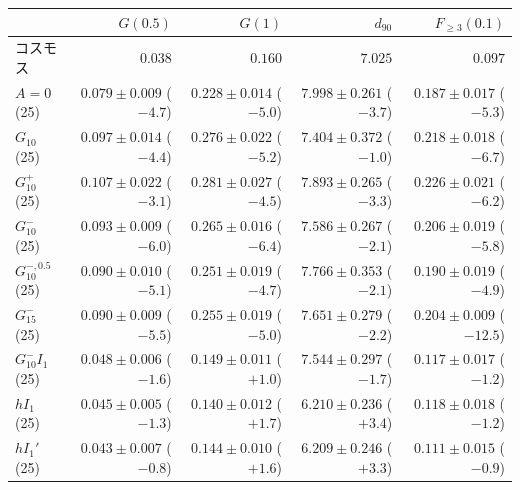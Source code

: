 \begin{tabular}{lrrrr}
\toprule
& $G(0.5)$ & $G(1)$ & $d_{90}$ & $F_{\ge 3}(0.1)$ \\
\midrule
コスモス & $0.038$ & $0.160$ & $7.025$ & $0.097$ \\
\midrule
$A = 0$ (25) & $0.079 \pm 0.009$ ($-4.7$) & $0.228 \pm 0.014$ ($-5.0$) & $7.998 \pm 0.261$ ($-3.7$) & $0.187 \pm 0.017$ ($-5.3$) \\
$G_{10}$ (25) & $0.097 \pm 0.014$ ($-4.4$) & $0.276 \pm 0.022$ ($-5.2$) & $7.404 \pm 0.372$ ($-1.0$) & $0.218 \pm 0.018$ ($-6.7$) \\
$G_{10}^{+}$ (25) & $0.107 \pm 0.022$ ($-3.1$) & $0.281 \pm 0.027$ ($-4.5$) & $7.893 \pm 0.265$ ($-3.3$) & $0.226 \pm 0.021$ ($-6.2$) \\
$G_{10}^{-}$ (25) & $0.093 \pm 0.009$ ($-6.0$) & $0.265 \pm 0.016$ ($-6.4$) & $7.586 \pm 0.267$ ($-2.1$) & $0.206 \pm 0.019$ ($-5.8$) \\
$G_{10}^{-,0.5}$ (25) & $0.090 \pm 0.010$ ($-5.1$) & $0.251 \pm 0.019$ ($-4.7$) & $7.766 \pm 0.353$ ($-2.1$) & $0.190 \pm 0.019$ ($-4.9$) \\
$G_{15}^{-}$ (25) & $0.090 \pm 0.009$ ($-5.5$) & $0.255 \pm 0.019$ ($-5.0$) & $7.651 \pm 0.279$ ($-2.2$) & $0.204 \pm 0.009$ ($-12.5$) \\
$G_{10}^{-}I_{1}$ (25) & $0.048 \pm 0.006$ ($-1.6$) & $0.149 \pm 0.011$ ($+1.0$) & $7.544 \pm 0.297$ ($-1.7$) & $0.117 \pm 0.017$ ($-1.2$) \\
$hI_{1}$ (25) & $0.045 \pm 0.005$ ($-1.3$) & $0.140 \pm 0.012$ ($+1.7$) & $6.210 \pm 0.236$ ($+3.4$) & $0.118 \pm 0.018$ ($-1.2$) \\
$hI_{1}'$ (25) & $0.043 \pm 0.007$ ($-0.8$) & $0.144 \pm 0.010$ ($+1.6$) & $6.209 \pm 0.246$ ($+3.3$) & $0.111 \pm 0.015$ ($-0.9$) \\
\bottomrule
\end{tabular}
